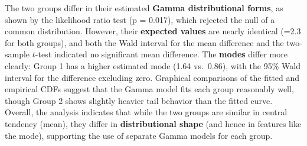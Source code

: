 \documentclass[
]{article}
\begin{document}
The two groups differ in their estimated \textbf{Gamma distributional
forms}, as shown by the likelihood ratio test (p = 0.017), which
rejected the null of a common distribution. However, their
\textbf{expected values} are nearly identical (=2.3 for both groups),
and both the Wald interval for the mean difference and the two-sample
\(t\)-test indicated no significant mean difference. The \textbf{modes}
differ more clearly: Group 1 has a higher estimated mode (1.64
vs.~0.86), with the 95\% Wald interval for the difference excluding
zero. Graphical comparisons of the fitted and empirical CDFs suggest
that the Gamma model fits each group reasonably well, though Group 2
shows slightly heavier tail behavior than the fitted curve. Overall, the
analysis indicates that while the two groups are similar in central
tendency (mean), they differ in \textbf{distributional shape} (and hence
in features like the mode), supporting the use of separate Gamma models
for each group.
\end{document}
